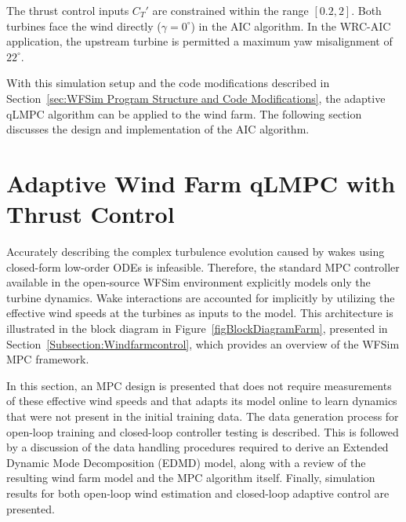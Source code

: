 The thrust control inputs $C_T'$ are constrained within the range $[0.2, 2]$. Both turbines face the wind directly ($\gamma = 0^{\circ}$) in the AIC algorithm. In the WRC-AIC application, the upstream turbine is permitted a maximum yaw misalignment of $22^{\circ}$.

With this simulation setup and the code modifications described in Section~\ref{sec:WFSim Program Structure and Code Modifications}, the adaptive qLMPC algorithm can be applied to the wind farm. The following section discusses the design and implementation of the AIC algorithm.

\section{Adaptive Wind Farm qLMPC with Thrust Control} \label{sec:AdaptiveWindFarmqLMPCforAIC}
Accurately describing the complex turbulence evolution caused by wakes using closed-form low-order ODEs is infeasible. Therefore, the standard MPC controller available in the open-source WFSim environment explicitly models only the turbine dynamics. Wake interactions are accounted for implicitly by utilizing the effective wind speeds at the turbines as inputs to the model. This architecture is illustrated in the block diagram in Figure~\ref{figBlockDiagramFarm}, presented in Section~\ref{Subsection:Windfarmcontrol}, which provides an overview of the WFSim MPC framework.

In this section, an MPC design is presented that does not require measurements of these effective wind speeds and that adapts its model online to learn dynamics that were not present in the initial training data. The data generation process for open-loop training and closed-loop controller testing is described. This is followed by a discussion of the data handling procedures required to derive an Extended Dynamic Mode Decomposition (EDMD) model, along with a review of the resulting wind farm model and the MPC algorithm itself. Finally, simulation results for both open-loop wind estimation and closed-loop adaptive control are presented. 


